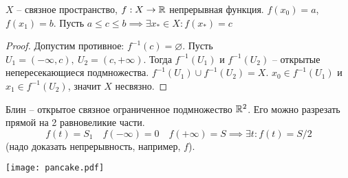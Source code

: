 \documentclass[main]{subfiles}
\begin{document}
\begin{theorem}
    $X$ -- связное пространство, $f: X \to \mathbb{R}$ непрерывная функция.
    $f(x_0) = a$, $f(x_1) = b$. Пусть $a \le c \le b \implies \exists x_* \in X: f(x_*) = c$
\end{theorem}
\begin{proof}
    Допустим противное: $f^{-1}(c) = \varnothing$.
    Пусть $U_1 = (-\infty, c),\ U_2 = (c, +\infty)$.
    Тогда $f^{-1}(U_1)$ и $f^{-1}(U_2)$ -- открытые непересекающиеся подмножества.
    $f^{-1}(U_1) \cup f^{-1}(U_2) = X$.
    $x_0 \in f^{-1}(U_1)$ и $x_1 \in f^{-1}(U_2)$, значит $X$ несвязно.
\end{proof}
\begin{example}
    Блин -- открытое связное ограниченное подмножество $\mathbb{R}^2$.
    Его можно разрезать прямой на 2 равновеликие части.
    \[
        f(t) = S_1 \quad f(-\infty) = 0 \quad f(+\infty) = S
        \implies \exists t: f(t) = S/2
    \]
    (надо доказать непрерывность, например, $f$).
    \begin{center}
        \texttt{[image: pancake.pdf]}
    \end{center}
\end{example}
\end{document}
